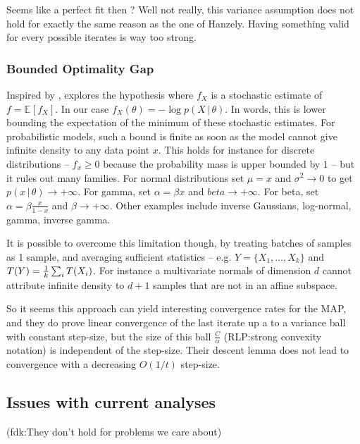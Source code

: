 \documentclass[twoside]{article}
\newcommand{\rlp}[1]{\textcolor{BrickRed}{(RLP:#1)}}
\newcommand{\fdk}[1]{\textcolor{Periwinkle}{(fdk:#1)}}
\newcommand*{\expect}[2][]{\ensuremath{\mathbb{E}_{#1} \left[ #2 \right] }} %
\newcommand*{\expecti}[2][]{\ensuremath{\mathbb{E}_{#1} [ #2 ] }} %
\newcommand{\cond}{\,\vert\,}
\newcommand{\nat}{\theta}
\begin{document}
Seems like a perfect fit then ? Well not really, this variance assumption does not hold for exactly the same reason as the one of Hanzely. Having something valid for every possible iterates is way too strong. 

\subsubsection{Bounded Optimality Gap}
Inspired by \citet{loizou2021stochastic}, \citet{dorazio2021stochastic} explores the hypothesis
\alignn{
\min_\nat f(\nat) - \expect[X]{\min_\nat f_X(\nat)} \leq C 
\label{eq:dorazio}
}
where $f_X$ is a stochastic estimate of $f = \expecti{f_X}$. In our case $f_X(\nat) = - \log p(X\cond \nat)$.
In words, this is lower bounding the expectation of the minimum of these stochastic estimates.
For probabilistic models, such a bound is finite as soon as the model cannot give infinite density to any data point $x$.
This holds for instance for discrete distributions 
-- $f_x\geq 0$ because the probability mass is upper bounded by $1$ -- 
but it rules out  many families.
For normal distributions set $\mu=x$ and $\sigma^2 \rightarrow 0$ to get $p(x\cond \nat) \rightarrow +\infty$. 
For gamma, set $\alpha = \beta x$ and $beta \rightarrow +\infty$.
For beta, set $\alpha=\beta \frac{x}{1-x}$ and $\beta \rightarrow +\infty$.
 Other examples include inverse Gaussians, log-normal, gamma, inverse gamma.
 
 It is possible to overcome this limitation though, by treating batches of samples as 1 sample, and averaging sufficient statistics -- e.g. $Y = \{X_1, \dots, X_k\}$ and $T(Y) = \frac{1}{k}\sum_i T(X_i)$.
 For instance a multivariate normals of dimension $d$ cannot attribute infinite density to $d+1$ samples that are not in an affine subspace.

So it seems this approach can yield interesting convergence rates for the MAP, and they do prove linear convergence of the last iterate up a to a variance ball with constant step-size, but the size of this ball $\frac{C}{\alpha}$ \rlp{strong convexity notation} is independent of  the step-size. Their descent lemma does not lead to convergence with a decreasing $O(1/t)$ step-size. 


\subsection{Issues with current analyses}

\fdk{They don't hold for problems we care about}
\end{document}
